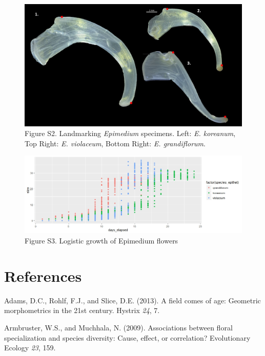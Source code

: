 \documentclass[]{article}
\begin{document}
\begin{figure}
\centering
\includegraphics{Figures/Figure_S2.jpg}
\caption{Figure S2. Landmarking \emph{Epimedium} specimens. Left:
\emph{E. koreanum}, Top Right: \emph{E. violaceum}, Bottom Right:
\emph{E. grandiflorum}.}
\end{figure}

\begin{figure}
\centering
\includegraphics{Figures/Figure_S3.jpeg}
\caption{Figure S3. Logistic growth of Epimedium flowers}
\end{figure}

\hypertarget{references}{%
\section{References}\label{references}}

\setlength{\parindent}{-0.2in}
\setlength{\leftskip}{0.2in}
\setlength{\parskip}{8pt}

\noindent

\hypertarget{refs}{}
\leavevmode\hypertarget{ref-adams_2013}{}%
Adams, D.C., Rohlf, F.J., and Slice, D.E. (2013). A field comes of age:
Geometric morphometrics in the 21st century. Hystrix \emph{24}, 7.

\leavevmode\hypertarget{ref-armbruster_2009}{}%
Armbruster, W.S., and Muchhala, N. (2009). Associations between floral
specialization and species diversity: Cause, effect, or correlation?
Evolutionary Ecology \emph{23}, 159.
\end{document}
